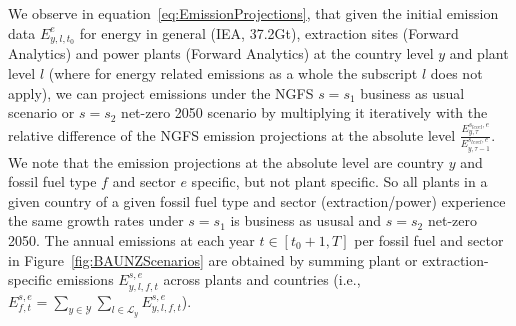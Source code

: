 \documentclass[11pt,a4paper,table,xcdraw]{article}
\begin{document}
We observe in equation~\ref{eq:EmissionProjections}, that given the initial emission data $E^{e}_{y,l,t_0}$ for energy in general (IEA, 37.2Gt), extraction sites (Forward Analytics) and power plants (Forward Analytics) at the country level $y$ and plant level $l$ (where for energy related emissions as a whole the subscript $l$ does not apply), we can project emissions under the NGFS $s=s_1$ business as usual scenario or $s=s_2$ net-zero 2050 scenario by multiplying it iteratively with the relative difference of the NGFS emission projections at the absolute level $\frac{E^{s_{level},e}_{y,\tau}}{E^{s_{level},e}_{y,\tau-1}}$. We note that the emission projections at the absolute level are country $y$ and fossil fuel type $f$ and sector $e$ specific, but not plant specific. So all plants in a given country of a given fossil fuel type and sector (extraction/power) experience the same growth rates under $s=s_1$ is business as ususal and $s=s_2$ net-zero 2050.\newline
\indent The annual emissions at each year $t \in [t_0+1,T]$ per fossil fuel and sector in Figure~\ref{fig:BAUNZScenarios} are obtained by summing plant or extraction-specific emissions $E^{s,e}_{y,l,f,t}$ across plants and countries (i.e.,
$E^{s,e}_{f,t}=\sum_{y\in \mathcal{Y}} \sum_{l \in \mathcal{L}_y} E^{s,e}_{y,l,f,t}$).
\end{document}
